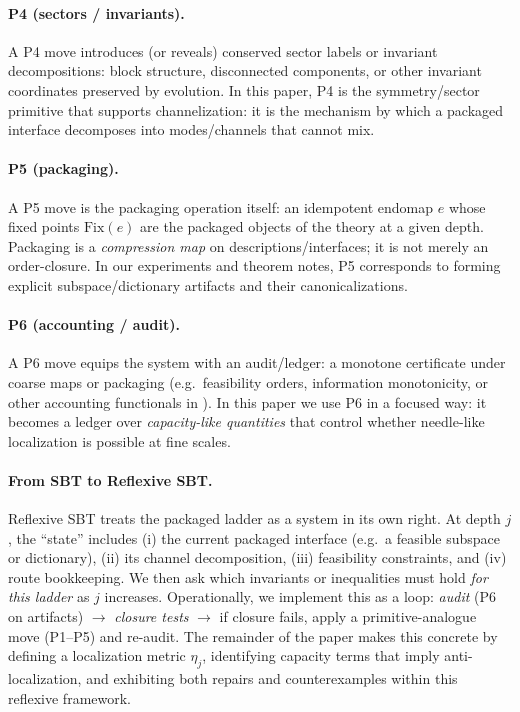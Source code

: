 \documentclass[11pt]{article}
\theoremstyle{plain}
\theoremstyle{definition}
\theoremstyle{remark}
\begin{document}
\paragraph{P4 (sectors / invariants).}
A P4 move introduces (or reveals) conserved sector labels or invariant decompositions: block structure, disconnected components, or other invariant coordinates preserved by evolution.
In this paper, P4 is the symmetry/sector primitive that supports channelization: it is the mechanism by which a packaged interface decomposes into modes/channels that cannot mix.

\paragraph{P5 (packaging).}
A P5 move is the packaging operation itself: an idempotent endomap \(e\) whose fixed points \(\mathrm{Fix}(e)\) are the packaged objects of the theory at a given depth.
Packaging is a \emph{compression map} on descriptions/interfaces; it is not merely an order-closure.
In our experiments and theorem notes, P5 corresponds to forming explicit subspace/dictionary artifacts and their canonicalizations.

\paragraph{P6 (accounting / audit).}
A P6 move equips the system with an audit/ledger: a monotone certificate under coarse maps or packaging (e.g.\ feasibility orders, information monotonicity, or other accounting functionals in \cite{sixbirds_foundations}).
In this paper we use P6 in a focused way: it becomes a ledger over \emph{capacity-like quantities} that control whether needle-like localization is possible at fine scales.

\paragraph{From SBT to Reflexive SBT.}
Reflexive SBT treats the packaged ladder as a system in its own right.
At depth \(j\), the ``state'' includes (i) the current packaged interface (e.g.\ a feasible subspace or dictionary), (ii) its channel decomposition, (iii) feasibility constraints, and (iv) route bookkeeping.
We then ask which invariants or inequalities must hold \emph{for this ladder} as \(j\) increases.
Operationally, we implement this as a loop: \emph{audit} (P6 on artifacts) \(\to\) \emph{closure tests} \(\to\) if closure fails, apply a primitive-analogue move (P1--P5) and re-audit.
The remainder of the paper makes this concrete by defining a localization metric \(\eta_j\), identifying capacity terms that imply anti-localization, and exhibiting both repairs and counterexamples within this reflexive framework.
\end{document}
